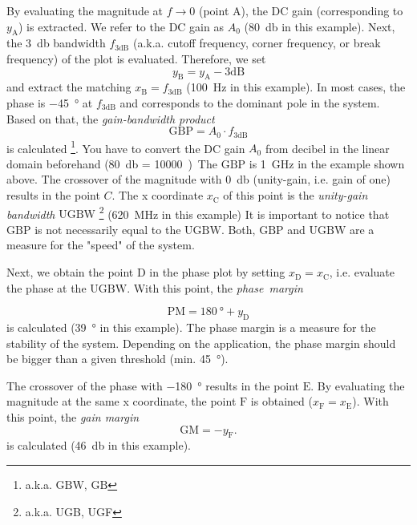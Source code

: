 \documentclass{article}[11pt]
\begin{document}
\medskip

By evaluating the magnitude at $f \rightarrow 0$ (point $\mathrm{A}$), the
DC gain (corresponding to $y_{\mathrm{A}}$) is extracted.
We refer to the DC gain as $A_0$ (\SI{80}{\decibel} in this example).
Next, the \SI{3}{\decibel} bandwidth $f_{\mathrm{3dB}}$ 
(a.k.a. cutoff frequency, corner frequency, or break frequency) of the
plot is evaluated. 
Therefore, we set
$$
y_{\mathrm{B}} = y_{\mathrm{A}} - 3 \mathrm{dB}
$$
and extract the matching $x_{\mathrm{B}} = f_{\mathrm{3dB}}$ 
(\SI{100}{\hertz} in this example).
In most cases, the phase is \SI{-45}{\degree} at
$f_{\mathrm{3dB}}$ and corresponds to the dominant pole in the system.
Based on that, the \textit{gain-bandwidth product}
\begin{equation}
\mathrm{GBP} = A_0 \cdot f_{\mathrm{3dB}}
\end{equation}
is calculated%
\footnote{a.k.a. $\mathrm{GBW}$, $\mathrm{GB}$}. 
You have to convert the DC gain $A_0$ from decibel in the linear domain 
beforehand (\SI{80}{\decibel} = \qty{10000}).
The $\mathrm{GBP}$ is \SI{1}{\giga\hertz} in the example shown above.
The crossover of the magnitude with \SI{0}{\decibel} 
(unity-gain, i.e. gain of one) results in the point $C$.
The x coordinate $x_{\mathrm{C}}$ of this point is the 
\textit{unity-gain bandwidth}
$\mathrm{UGBW}$%
\footnote{a.k.a. UGB, UGF}
(\SI{620}{\mega\hertz} in this example)
It is important to notice that $\mathrm{GBP}$ is not necessarily
equal to the $\mathrm{UGBW}$.
Both, $\mathrm{GBP}$ and $\mathrm{UGBW}$ are a measure for the "speed" of
the system.

\medskip

Next, we obtain the point $\mathrm{D}$ in the phase plot by setting 
$x_{\mathrm{D}} = x_{\mathrm{C}}$, i.e. evaluate the phase at the 
$\mathrm{UGBW}$.
With this point, the \textit{phase~margin}

$$
\mathrm{PM} = \SI{180}{\degree} + y_{\mathrm{D}}
$$
is calculated (\SI{39}{\degree} in this example).
The phase margin is a measure for the stability of the system.
Depending on the application, the phase margin should be bigger than a 
given threshold (min. \SI{45}{\degree}).

The crossover of the phase with \SI{-180}{\degree} results in the 
point $\mathrm{E}$.
By evaluating the magnitude at the same x coordinate, the point 
$\mathrm{F}$ is obtained ($x_{\mathrm{F}} = x_{\mathrm{E}}$).
With this point, the \textit{gain margin}
$$
\mathrm{GM} = - y_{\mathrm{F}}.
$$
is calculated (\SI{46}{\decibel} in this example).

\printbibliography
\end{document}
